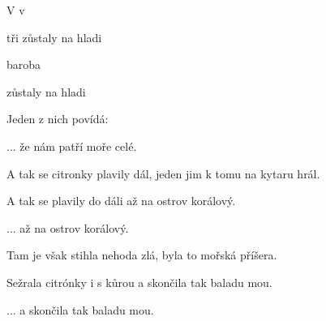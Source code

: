 

\zs
V   
  v 

 tři  
zůstaly na hladi
\ks

\zr
{}baroba   

   

zůstaly na hladi
\kr

\zs
Jeden z nich povídá: 
\ks

\zr  ... že nám patří moře celé. \kr

\zs
A tak se citronky plavily dál, jeden jim k tomu na kytaru hrál.

A tak se plavily do dáli až na ostrov korálový.
\ks

\zr  ... až na ostrov korálový. \kr

\zs
Tam je však stihla nehoda zlá, byla to mořská příšera.

Sežrala citrónky i s kůrou a skončila tak baladu mou.
\ks

\zr  ... a skončila tak baladu mou. \kr

\kp























